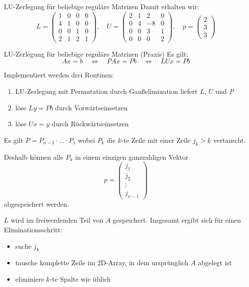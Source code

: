 \begin{example}{LU-Zerlegung für beliebige reguläre Matrizen}
    Damit erhalten wir:
    \[
        L =
        \begin{pmatrix}
            1 & 0 & 0 & 0 \\
            4 & 1 & 0 & 0 \\
            0 & 0 & 1 & 0 \\
            2 & 1 & 2 & 1
        \end{pmatrix}, \quad
        U =
        \begin{pmatrix}
            2 & 1 & 2  & 0 \\
            0 & 4 & -8 & 0 \\
            0 & 0 & 3  & 1 \\
            0 & 0 & 0  & 2
        \end{pmatrix}, \quad
        p = \begin{pmatrix}
            2 \\ 3 \\ 3
        \end{pmatrix}
    \]
\end{example}

\begin{defi}{LU-Zerlegung für beliebige reguläre Matrizen (Praxis)}
    Es gilt:
    \[
        Ax = b \quad \iff \quad PAx = Pb \quad \iff \quad LUx = Pb
    \]

    Implementiert werden drei Routinen:
    \begin{enumerate}
        \item LU-Zerlegung mit Permutation durch Gaußelimination liefert $L$, $U$ und $P$
        \item löse $Ly = Pb$ durch Vorwärtseinsetzen
        \item löse $Ux = y$ durch Rückwärtseinsetzen
    \end{enumerate}

    Es gilt $P = P_{n-1} \cdot \ldots \cdot P_1$ wobei $P_k$ die $k$-te Zeile mit einer Zeile $j_k > k$ vertauscht.

    Deshalb können alle $P_k$ in einem einzigen ganzzahligen Vektor
    \[
        p = \begin{pmatrix}
            j_1    \\
            j_2    \\
            \vdots \\
            j_{n-1}
        \end{pmatrix}
    \]
    abgespeichert werden.

    $L$ wird im freiwerdenden Teil von $A$ gespeichert.
    Insgesamt ergibt sich für einen Eliminationsschritt:
    \begin{itemize}
        \item suche $j_k$
        \item tausche komplette Zeile im 2D-Array, in dem ursprünglich $A$ abgelegt ist
        \item eliminiere $k$-te Spalte wie üblich
    \end{itemize}
\end{defi}

